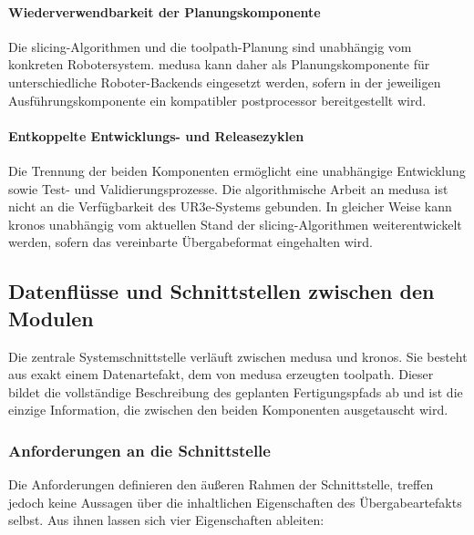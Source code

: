             \paragraph{Wiederverwendbarkeit der Planungskomponente}
                Die \gls{slicing}-Algorithmen und die \gls{toolpath}-Planung sind unabhängig vom konkreten Robotersystem.
                \ac{medusa} kann daher als Planungskomponente für unterschiedliche Roboter-Backends eingesetzt werden, sofern in der jeweiligen Ausführungskomponente ein kompatibler \gls{postprocessor} bereitgestellt wird.

            \paragraph{Entkoppelte Entwicklungs- und Releasezyklen}
                Die Trennung der beiden Komponenten ermöglicht eine unabhängige Entwicklung sowie Test- und Validierungsprozesse.
                Die algorithmische Arbeit an \ac{medusa} ist nicht an die Verfügbarkeit des UR3e-Systems gebunden.
                In gleicher Weise kann \ac{kronos} unabhängig vom aktuellen Stand der \gls{slicing}-Algorithmen weiterentwickelt werden, sofern das vereinbarte Übergabeformat eingehalten wird.

        \subsection{Datenflüsse und Schnittstellen zwischen den Modulen}\label{subsec:data-flows-and-interfaces-between-modules}
            Die zentrale Systemschnittstelle verläuft zwischen \ac{medusa} und \ac{kronos}.
            Sie besteht aus exakt einem Datenartefakt, dem von \ac{medusa} erzeugten \gls{toolpath}.
            Dieser bildet die vollständige Beschreibung des geplanten Fertigungspfads ab und ist die einzige Information, die zwischen den beiden Komponenten ausgetauscht wird.

            \subsubsection{Anforderungen an die Schnittstelle}\label{subsubsec:interface-requirements}
                Die Anforderungen definieren den äußeren Rahmen der Schnittstelle, treffen jedoch keine Aussagen über die inhaltlichen Eigenschaften des Übergabeartefakts selbst.
                Aus ihnen lassen sich vier Eigenschaften ableiten:

